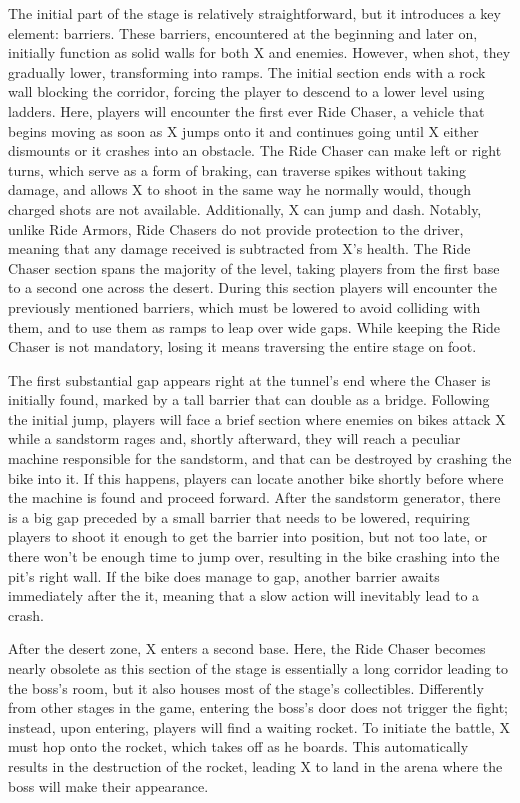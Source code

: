 The initial part of the stage is relatively straightforward, but it introduces a key element: barriers. These barriers, encountered at the beginning and later on, initially function as solid walls for both X and enemies. However, when shot, they gradually lower, transforming into ramps. The initial section ends with a rock wall blocking the corridor, forcing the player to descend to a lower level using ladders. Here, players will encounter the first ever Ride Chaser, a vehicle that begins moving as soon as X jumps onto it and continues going until X either dismounts or it crashes into an obstacle. The Ride Chaser can make left or right turns, which serve as a form of braking, can traverse spikes without taking damage, and allows X to shoot in the same way he normally would, though charged shots are not available. Additionally, X can jump and dash. Notably, unlike Ride Armors, Ride Chasers do not provide protection to the driver, meaning that any damage received is subtracted from X's health. The Ride Chaser section spans the majority of the level, taking players from the first base to a second one across the desert. During this section players will encounter the previously mentioned barriers, which must be lowered to avoid colliding with them, and to use them as ramps to leap over wide gaps. While keeping the Ride Chaser is not mandatory, losing it means traversing the entire stage on foot.

The first substantial gap appears right at the tunnel's end where the Chaser is initially found, marked by a tall barrier that can double as a bridge. Following the initial jump, players will face a brief section where enemies on bikes attack X while a sandstorm rages and, shortly afterward, they will reach a peculiar machine responsible for the sandstorm, and that can be destroyed by crashing the bike into it. If this happens, players can locate another bike shortly before where the machine is found and proceed forward. After the sandstorm generator, there is a big gap preceded by a small barrier that needs to be lowered, requiring players to shoot it enough to get the barrier into position, but not too late, or there won't be enough time to jump over, resulting in the bike crashing into the pit's right wall. If the bike does manage to gap, another barrier awaits immediately after the it, meaning that a slow action will inevitably lead to a crash.

After the desert zone, X enters a second base. Here, the Ride Chaser becomes nearly obsolete as this section of the stage is essentially a long corridor leading to the boss's room, but it also houses most of the stage's collectibles. Differently from other stages in the game, entering the boss's door does not trigger the fight; instead, upon entering, players will find a waiting rocket. To initiate the battle, X must hop onto the rocket, which takes off as he boards. This automatically results in the destruction of the rocket, leading X to land in the arena where the boss will make their appearance.

